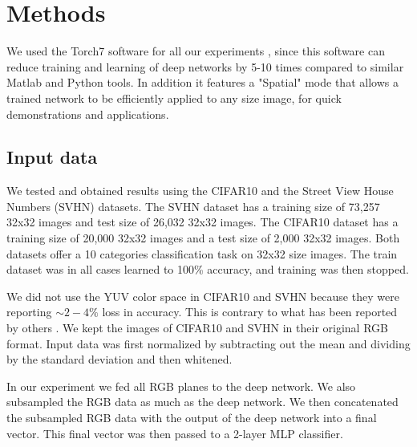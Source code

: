 \documentclass{article} %
\begin{document}


\section{Methods}
\label{sec-methods}


We used the Torch7 software for all our experiments \cite{collobert_torch7_2011}, since this software can reduce training and learning of deep networks by 5-10 times compared to similar Matlab and Python tools. In addition it features a "Spatial" mode that allows a trained network to be efficiently applied to any size image, for quick demonstrations and applications.


\subsection{Input data}

We tested and obtained results using the CIFAR10 \cite{krizhevsky_learning_2009} and the Street View House Numbers (SVHN) \cite{netzer_reading_2011} datasets. The SVHN dataset has a training size of 73,257 32x32 images and test size of 26,032 32x32 images. The CIFAR10 dataset has a training size of 20,000 32x32 images and a test size of 2,000 32x32 images. Both datasets offer a 10 categories classification task on 32x32 size images. The train dataset was in all cases learned to 100\% accuracy, and training was then stopped. 

We did not use the YUV color space in CIFAR10 and SVHN because they were reporting $\sim 2-4\%$ loss in accuracy. This is contrary to what has been reported by others \cite{jarrett_what_2009}. We kept the images of CIFAR10 and SVHN in their original RGB format. Input data was first normalized by subtracting out the mean and dividing by the standard deviation and then whitened.

In our experiment we fed all RGB planes to the deep network. We also subsampled the RGB data as much as the deep network. We then concatenated the subsampled RGB data with the output of the deep network into a final vector. This final vector was then passed to a 2-layer MLP classifier. 
\end{document}
